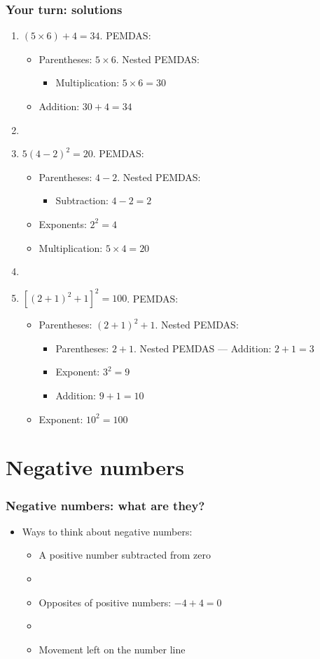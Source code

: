 \documentclass[12pt]{beamer}
\newcommand{\myframe}[1]{\begin{frame} \frametitle{#1}}
\begin{document}
\myframe{Your turn: solutions}
\begin{enumerate}
\item $(5 \times 6) + 4 = 34$. PEMDAS:
\begin{itemize}
\item Parentheses: $5 \times 6$. Nested PEMDAS:
\begin{itemize}
\item Multiplication: $5 \times 6 = 30$
\end{itemize}
\item Addition: $30 + 4 = 34$
\end{itemize}
\item[]
\item $5(4 - 2)^2 = 20$. PEMDAS:
\begin{itemize}
\item Parentheses: $4 - 2$. Nested PEMDAS:
\begin{itemize}
\item Subtraction: $4 - 2 = 2$
\end{itemize}
\item Exponents: $2^2 = 4$
\item Multiplication: $5 \times 4 = 20$
\end{itemize}
\item[]
\item $[(2+1)^2 + 1]^2 = 100$. PEMDAS:
\begin{itemize}
\item Parentheses: $(2 + 1)^2 + 1$. Nested PEMDAS:
\begin{itemize}
\item Parentheses: $2 + 1$. Nested PEMDAS --- Addition: $2 + 1 = 3$
\item Exponent: $3^2 = 9$ 
\item Addition: $9 + 1 = 10$
\end{itemize}
\item Exponent: $10^2 = 100$
\end{itemize}
\end{enumerate}
\end{frame}

\section{Negative numbers}
\myframe{Negative numbers: what are they?}
\begin{itemize}
\item Ways to think about negative numbers:
\begin{itemize}
\item A positive number subtracted from zero
\item[]
\item Opposites of positive numbers: $-4 + 4 = 0$
\item[]
\item Movement left on the number line
\end{itemize}
\end{itemize}
\end{frame}
\end{document}
